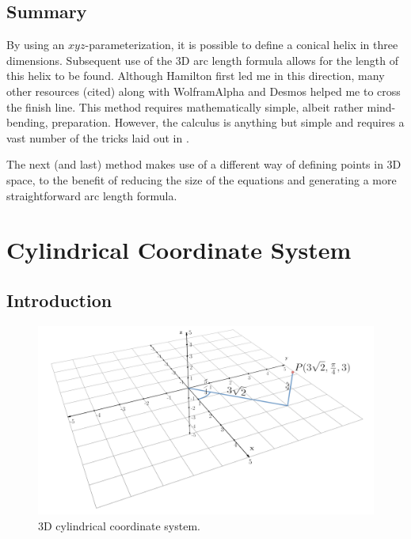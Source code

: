 \documentclass{article}
\begin{document}
\subsection{Summary}
By using an $xyz$-parameterization, it is possible to define a conical helix in three dimensions. Subsequent use of the 3D arc length formula allows for the length of this helix to be found. Although Hamilton \cite{Bib:param} first led me in this direction, many other resources (cited) along with WolframAlpha and Desmos helped me to cross the finish line. This method requires mathematically simple, albeit rather mind-bending, preparation. However, the calculus is anything but simple and requires a vast number of the tricks laid out in \cite{Bib:Class1Var}.\par
The next (and last) method makes use of a different way of defining points in 3D space, to the benefit of reducing the size of the equations and generating a more straightforward arc length formula.
\newpage



\section{Cylindrical Coordinate System}
\subsection{Introduction}

\begin{figure}[h!]
    \centering
    \includegraphics[width=0.711\linewidth]{Blender/cylindrical.png}
    \caption{3D cylindrical coordinate system.}
    \label{fig:cyli}
\end{figure}
\end{document}

